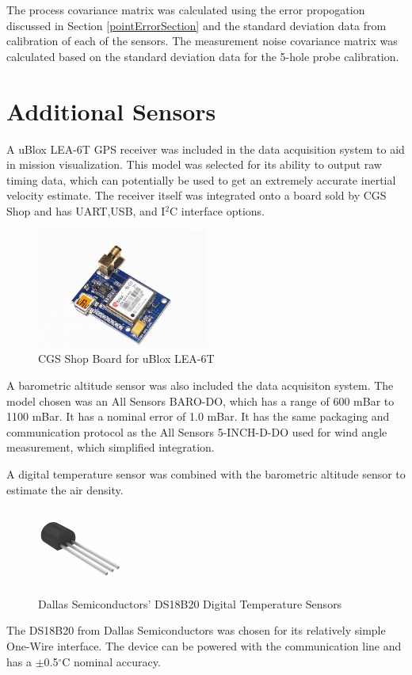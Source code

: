 The process covariance matrix was calculated using the error propogation discussed in Section \ref{pointErrorSection} and the standard deviation data from calibration of each of the sensors. The measurement noise covariance matrix was calculated based on the standard deviation data for the 5-hole probe calibration.


\section{Additional Sensors}
A uBlox LEA-6T GPS receiver was included in the data acquisition system to aid in mission visualization. This model was selected for its ability to output raw timing data, which can potentially be used to get an extremely accurate inertial velocity estimate\cite{ubloxDemo}. The receiver itself was integrated onto a board sold by CGS Shop and has UART,USB, and I$^2$C interface options. 

\begin{figure}[H]
  \caption{CGS Shop Board for uBlox LEA-6T} \label{gpsPicture}
  \centering
    \includegraphics[width=0.5\textwidth]{figures/gpsBoard.jpg}
\end{figure}

A barometric altitude sensor was also included the data acquisiton system. The model chosen was an All Sensors BARO-DO, which has a range of 600 mBar to 1100 mBar\cite{allSensorsBaroDatasheet}. It has a nominal error of 1.0 mBar. It has the same packaging and communication protocol as the All Sensors 5-INCH-D-DO used for wind angle measurement, which simplified integration.

A digital temperature sensor was combined with the barometric altitude sensor to estimate the air density.
\begin{figure}[H]
  \caption{Dallas Semiconductors' DS18B20 Digital Temperature Sensors} \label{ds18b20Picture}
  \centering
    \includegraphics[width=0.25\textwidth]{figures/ds18b20Picture.jpg}
\end{figure}
 The DS18B20 from Dallas Semiconductors was chosen for its relatively simple One-Wire interface. The device can be powered with the communication line and has a $\pm$0.5$^\circ$C nominal accuracy\cite{DS18B20Datasheet}.

